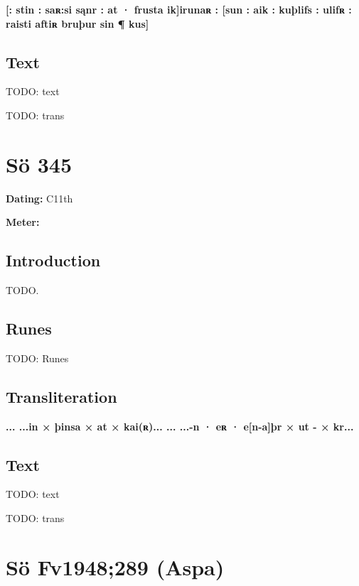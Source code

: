 \textbf{[: stin : saʀ:si sąnr : at · frusta ik]irunaʀ : [sun : aik : kuþlifs : ulifʀ : raisti aftiʀ bruþur sin ¶ kus]}

\subsection{Text}

\bpg\bpa[0]%
TODO: text\epa

\bpb TODO: trans\epb\epg

\sectionline\clearpage


\section{Sö 345}

\begin{flushright}%
\textbf{Dating:} C11th

\textbf{Meter:} \Fornyrdislag
\end{flushright}%

\subsection{Introduction}

TODO.

\subsection{Runes}

TODO: Runes%

\subsection{Transliteration}

\textbf{... ...in × þinsa × at × kai(ʀ)... ... ...-n · eʀ · e[n-a]þr × ut - × kr...}

\subsection{Text}

\bpg\bpa[0]%
TODO: text\epa

\bpb TODO: trans\epb\epg

\sectionline\clearpage


\section{Sö Fv1948;289 (Aspa)}

